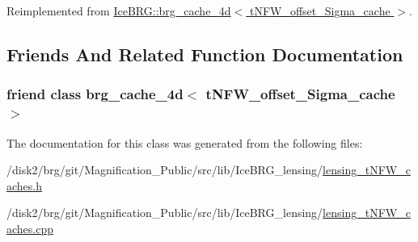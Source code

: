 Reimplemented from \hyperlink{classIceBRG_1_1brg__cache__4d_a422e37f487c9c39ce42d26e3b1866693}{Ice\-B\-R\-G\-::brg\-\_\-cache\-\_\-4d$<$ t\-N\-F\-W\-\_\-offset\-\_\-\-Sigma\-\_\-cache $>$}.



\subsection{Friends And Related Function Documentation}
\hypertarget{classIceBRG_1_1tNFW__offset__Sigma__cache_a070c97d6c85feabe82ca95b429759bbc}{
\subsubsection[{brg\-\_\-cache\-\_\-4d$<$ t\-N\-F\-W\-\_\-offset\-\_\-\-Sigma\-\_\-cache $>$}]{\setlength{\rightskip}{0pt plus 5cm}friend class {\bf brg\-\_\-cache\-\_\-4d}$<$ {\bf t\-N\-F\-W\-\_\-offset\-\_\-\-Sigma\-\_\-cache} $>$\hspace{0.3cm}{\ttfamily [friend]}}}\label{classIceBRG_1_1tNFW__offset__Sigma__cache_a070c97d6c85feabe82ca95b429759bbc}


The documentation for this class was generated from the following files\-:\begin{DoxyCompactItemize}
\item 
/disk2/brg/git/\-Magnification\-\_\-\-Public/src/lib/\-Ice\-B\-R\-G\-\_\-lensing/\hyperlink{lensing__tNFW__caches_8h}{lensing\-\_\-t\-N\-F\-W\-\_\-caches.\-h}\item 
/disk2/brg/git/\-Magnification\-\_\-\-Public/src/lib/\-Ice\-B\-R\-G\-\_\-lensing/\hyperlink{lensing__tNFW__caches_8cpp}{lensing\-\_\-t\-N\-F\-W\-\_\-caches.\-cpp}\end{DoxyCompactItemize}
